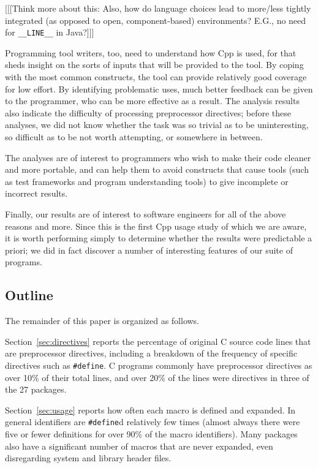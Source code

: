 \documentclass[11pt]{article}
\def\numpackages{27}
\begin{document}
[[[Think more about this:  Also, how do language choices lead to more/less
tightly integrated (as opposed to open, component-based) environments?
E.G., no need for \verb|__LINE__| in Java?]]]

Programming tool writers, too, need to understand how Cpp is used, for that
sheds insight on the sorts of inputs that will be provided to the tool.  By
coping with the most common constructs, the tool can provide relatively
good coverage for low effort.  By identifying problematic uses, much better
feedback can be given to the programmer, who can be more effective as a
result.  The analysis results also indicate the difficulty of processing
preprocessor directives; before these analyses, we did not know whether the
task was so trivial as to be uninteresting, so difficult as to be not worth
attempting, or somewhere in between.

The analyses are of interest to programmers who wish to make their code
cleaner and more portable, and can help them to avoid constructs that cause
tools (such as test frameworks and program understanding tools)
to give incomplete or incorrect results.


Finally, our results are of interest to software engineers for all of the
above reasons and more.  Since this is the first Cpp usage study of which
we are aware, it is worth performing simply to determine whether the
results were predictable a priori; we did in fact discover a number of
interesting features of our suite of programs.


\subsection{Outline}

The remainder of this paper is organized as follows.

Section~\ref{sec:directives} reports the percentage of original C source
code lines that are preprocessor directives, including a breakdown of the
frequency of specific directives such as {\tt \#define}.  C programs
commonly have preprocessor directives as over 10\% of their total lines,
and over 20\% of the lines were directives in three of the {\numpackages}
packages.

Section~\ref{sec:usage} reports how often each macro is defined and
expanded.  In general identifiers are {\tt \#define}d relatively few times
(almost always there were five or fewer definitions for over 90\% of the
macro identifiers).  Many packages also have a significant number of macros
that are never expanded, even disregarding system and library header files.
\end{document}
